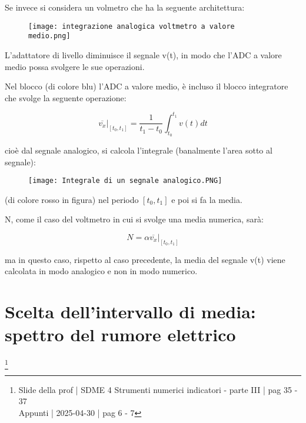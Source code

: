 Se invece si considera un volmetro che ha la seguente architettura: 

\begin{figure}[h]
    \centering
    \texttt{[image: integrazione analogica voltmetro a valore medio.png]}
\end{figure}

L'adattatore di livello diminuisce il segnale v(t), in modo che l'ADC a valore medio possa svolgere le sue operazioni. \newline 

Nel blocco (di colore blu) l'ADC a valore medio, 
è incluso il blocco integratore che svolge la seguente operazione: 

{
    \Large 
    \begin{equation}
    \left. \overline{v_x} \right|_{[t_0, t_1]}
    = 
    \frac{1}{t_1 - t_0}
    \int_{t_0}^{t_1}
    v(t) dt
    \end{equation}
}

cioè dal segnale analogico, si calcola l'integrale (banalmente l'area sotto al segnale):   

\begin{figure}[h]
    \centering
    \texttt{[image: Integrale di un segnale analogico.PNG]}
\end{figure}

(di colore rosso in figura) nel periodo $[t_0, t_1]$ e poi si fa la media. \newline 

N, come il caso del voltmetro in cui si svolge una media numerica, sarà: 

{
    \Large 
    \begin{equation}
        N = \alpha \left. \overline{v_x} \right|_{[t_0, t_1]}
    \end{equation}
}

ma in questo caso, rispetto al caso precedente, la media del segnale v(t) viene calcolata in modo analogico e non in modo numerico. \newline 

\newpage 

\section{Scelta dell'intervallo di media: spettro del rumore elettrico}
\footnote{Slide della prof | SDME 4 Strumenti numerici indicatori - parte III | pag  35 - 37\\  
Appunti | 2025-04-30 | pag 6 - 7}

